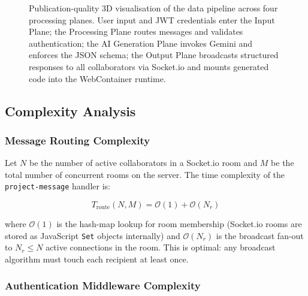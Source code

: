 \begin{figure}[H]
  \caption{Publication-quality 3D visualisation of the \echoray{} data
    pipeline across four processing planes. User input and JWT credentials
    enter the Input Plane; the Processing Plane routes messages and validates
    authentication; the AI Generation Plane invokes Gemini and enforces the
    JSON schema; the Output Plane broadcasts structured responses to all
    collaborators via Socket.io and mounts generated code into the
    WebContainer runtime.}
  \label{fig:3d_pipeline}
\end{figure}

\subsection{Complexity Analysis}
\label{sub:complexity}

\subsubsection{Message Routing Complexity}

Let $N$ be the number of active collaborators in a Socket.io room and
$M$ be the total number of concurrent rooms on the server. The time complexity
of the \texttt{project-message} handler is:

\begin{equation}
  T_{\text{route}}(N, M) = \mathcal{O}(1) + \mathcal{O}(N_r)
  \label{eq:route_complexity}
\end{equation}

\noindent where $\mathcal{O}(1)$ is the hash-map lookup for room membership
(Socket.io rooms are stored as JavaScript \texttt{Set} objects internally) and
$\mathcal{O}(N_r)$ is the broadcast fan-out to $N_r \leq N$ active connections
in the room. This is optimal: any broadcast algorithm must touch each
recipient at least once.

\subsubsection{Authentication Middleware Complexity}


